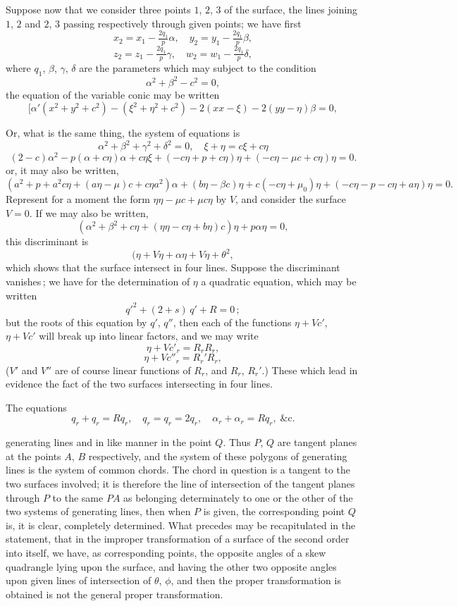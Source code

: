 \documentclass[11pt,a4paper]{article}
\theoremstyle{definition}
\begin{document}
\medskip

Suppose now that we consider three points $1$, $2$, $3$ of the surface, the lines joining
$1$, $2$ and $2$, $3$ passing respectively through given points; we have first
\[
x_2 = x_1 - \tfrac{2 q_1}{p}\alpha,\quad y_2 = y_1 - \tfrac{2 q_1}{p}\beta,
\]
\[
z_2 = z_1 - \tfrac{2 q_1}{p}\gamma,\quad w_2 = w_1 - \tfrac{2 q_1}{p}\delta,
\]
where $q_1$, $\beta$, $\gamma$, $\delta$ are the parameters which may subject to the condition
\[
\alpha^2 + \beta^2 - c^2 = 0,
\]
the equation of the variable conic may be written
\[
[\alpha'(x^2 + y^2 + c^2) - (\xi^2 + \eta^2 + c^2) - 2(xx - \xi) - 2(yy - \eta)\beta = 0,
\]
\medskip

Or, what is the same thing, the system of equations is
\[
\alpha^2 + \beta^2 + \gamma^2 + \delta^2 = 0,
\quad
\xi + \eta = c\xi + c\eta
\]
\[
(2-c)\alpha^2 - p(\alpha+c\eta)\alpha + c\eta\xi
+ (-c\eta + p + c\eta)\eta
+ (-c\eta - \mu c + c\eta)\eta = 0.
\]
or, it may also be written,
\[
(a^2 + p + a^2c\eta + (a\eta - \mu)c + c\eta a^2)\alpha + (b\eta - \beta c)\eta
+ c(-c\eta + \mu_0)\eta + (-c\eta - p - c\eta + a\eta)\eta = 0.
\]
Represent for a moment the form $\eta\eta - \mu c + \mu c\eta$ by $V$, and consider the surface
$V=0$. If we may also be written,
\[
(\alpha^2 + \beta^2 + c \eta + (\eta\eta - c\eta + b\eta)c) \eta + p \alpha \eta = 0,
\]
this discriminant is
\[
(\eta + V\eta + \alpha\eta + V\eta + \theta^2,
\]
which shows that the surface intersect in four lines. Suppose the discriminant vanishes\,;
we have for the determination of $\eta$ a quadratic equation, which may be written
\[
q'^2 + (2 + s)\,q' + R = 0\,;
\]
but the roots of this equation by $q'$, $q''$, then each of the functions $\eta + Vc'$, $\eta + Vc'$
will break up into linear factors, and we may write
\[
\eta + Vc'_r = R_r R_r,
\]
\[
\eta + V c''_r = R_r' R_r,
\]
($V'$ and $V''$ are of course linear functions of $R_r$, and $R_r$, $R_r'$.) These which lead in
evidence the fact of the two surfaces intersecting in four lines.

\medskip

The equations
\[
q_r + q_r = R q_r,
\quad q_r = q_r = 2 q_r,
\quad \alpha_r + \alpha_r = R q_r,\;\&\mathrm{c}.
\]

\medskip

generating lines and in like manner in the point $Q$. Thus $P$, $Q$ are tangent planes
at the points $A$, $B$ respectively, and the system of these polygons of generating
lines is the system of common chords. The chord in question is a tangent to the two
surfaces involved; it is therefore the line of intersection of the tangent planes through
$P$ to the same $PA$ as belonging determinately to one or the other of the two
systems of generating lines, then when $P$ is given, the corresponding point $Q$ is, it
is clear, completely determined. What precedes may be recapitulated in the statement,
that in the improper transformation of a surface of the second order into itself, we
have, as corresponding points, the opposite angles of a skew quadrangle lying upon
the surface, and having the other two opposite angles upon given lines of
intersection of $\theta$, $\phi$, and then the proper transformation is obtained is not the general
proper transformation.
\end{document}
